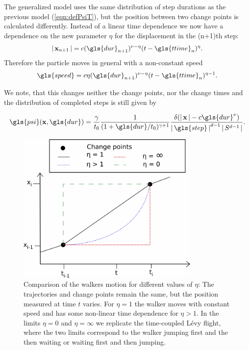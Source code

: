 The generalized model uses the same distribution of step durations as the previous model (\ref{eqn:defPsiT}), but the position between two change points is calculated differently. Instead of a linear time dependence we now have a dependence on the new parameter $\eta$ for the displacement in the (n+1)th step:
%
\begin{align}
\abs{\ve{x}_{n+1}} = c (\gls{dur}_{n+1})^{\nu-\eta} (t-\gls{ttime}_n)^{\eta} .
\end{align}
%
Therefore the particle moves in general with a non-constant speed  
%
\begin{align}
\gls{speed} = c \eta (\gls{dur}_{n+1})^{\nu-\eta} (t-\gls{ttime}_n)^{\eta-1} .
\end{align}

We note, that this changes neither the change points, nor the change times and the distribution of completed steps is still given by 

\begin{align}
\gls{psi}(\ve{x}, \gls{dur} ) = \frac{\gamma}{t_0} \frac{1}{(1+\gls{dur}/t_0)^{\gamma+1}}  \frac{\delta(\abs{\ve{x}} - c \gls{dur}^{\nu}) }{\abs{\gls{step}}^{d-1} \abs{S^{d-1}}}  .
\end{align}


\begin{figure}[!htb]
\begin{center}
\includegraphics[width=90mm]{pics/turningPoints.png}
\caption{Comparison of the walkers motion for different values of $\eta$: The trajectories and change points remain the same, but the position measured at time $t$ varies. For $\eta = 1$ the walker moves with constant speed and has some non-linear time dependence for $\eta > 1$. In the limits $\eta = 0$ and $\eta = \infty$ we replicate the time-coupled L\'evy flight, where the two limits correspond to the walker jumping first and the then waiting or waiting first and then jumping. 
\label{fig:turningPoints}}
\end{center}
\end{figure}

